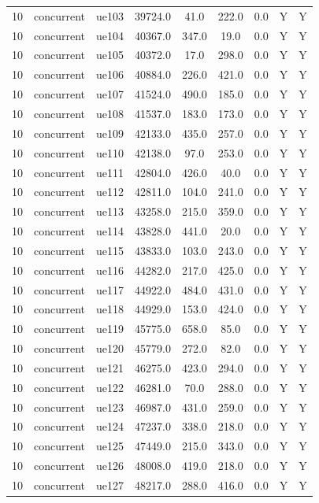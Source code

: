 \begin{table}[ht]
\begin{tabular}{|c|c|c|c|c|c|c|c|c|}
10 & concurrent & ue103 & 39724.0 & 41.0 & 222.0 & 0.0 & Y & Y \\
10 & concurrent & ue104 & 40367.0 & 347.0 & 19.0 & 0.0 & Y & Y \\
10 & concurrent & ue105 & 40372.0 & 17.0 & 298.0 & 0.0 & Y & Y \\
10 & concurrent & ue106 & 40884.0 & 226.0 & 421.0 & 0.0 & Y & Y \\
10 & concurrent & ue107 & 41524.0 & 490.0 & 185.0 & 0.0 & Y & Y \\
10 & concurrent & ue108 & 41537.0 & 183.0 & 173.0 & 0.0 & Y & Y \\
10 & concurrent & ue109 & 42133.0 & 435.0 & 257.0 & 0.0 & Y & Y \\
10 & concurrent & ue110 & 42138.0 & 97.0 & 253.0 & 0.0 & Y & Y \\
10 & concurrent & ue111 & 42804.0 & 426.0 & 40.0 & 0.0 & Y & Y \\
10 & concurrent & ue112 & 42811.0 & 104.0 & 241.0 & 0.0 & Y & Y \\
10 & concurrent & ue113 & 43258.0 & 215.0 & 359.0 & 0.0 & Y & Y \\
10 & concurrent & ue114 & 43828.0 & 441.0 & 20.0 & 0.0 & Y & Y \\
10 & concurrent & ue115 & 43833.0 & 103.0 & 243.0 & 0.0 & Y & Y \\
10 & concurrent & ue116 & 44282.0 & 217.0 & 425.0 & 0.0 & Y & Y \\
10 & concurrent & ue117 & 44922.0 & 484.0 & 431.0 & 0.0 & Y & Y \\
10 & concurrent & ue118 & 44929.0 & 153.0 & 424.0 & 0.0 & Y & Y \\
10 & concurrent & ue119 & 45775.0 & 658.0 & 85.0 & 0.0 & Y & Y \\
10 & concurrent & ue120 & 45779.0 & 272.0 & 82.0 & 0.0 & Y & Y \\
10 & concurrent & ue121 & 46275.0 & 423.0 & 294.0 & 0.0 & Y & Y \\
10 & concurrent & ue122 & 46281.0 & 70.0 & 288.0 & 0.0 & Y & Y \\
10 & concurrent & ue123 & 46987.0 & 431.0 & 259.0 & 0.0 & Y & Y \\
10 & concurrent & ue124 & 47237.0 & 338.0 & 218.0 & 0.0 & Y & Y \\
10 & concurrent & ue125 & 47449.0 & 215.0 & 343.0 & 0.0 & Y & Y \\
10 & concurrent & ue126 & 48008.0 & 419.0 & 218.0 & 0.0 & Y & Y \\
10 & concurrent & ue127 & 48217.0 & 288.0 & 416.0 & 0.0 & Y & Y \\

\end{tabular}
\end{table}

